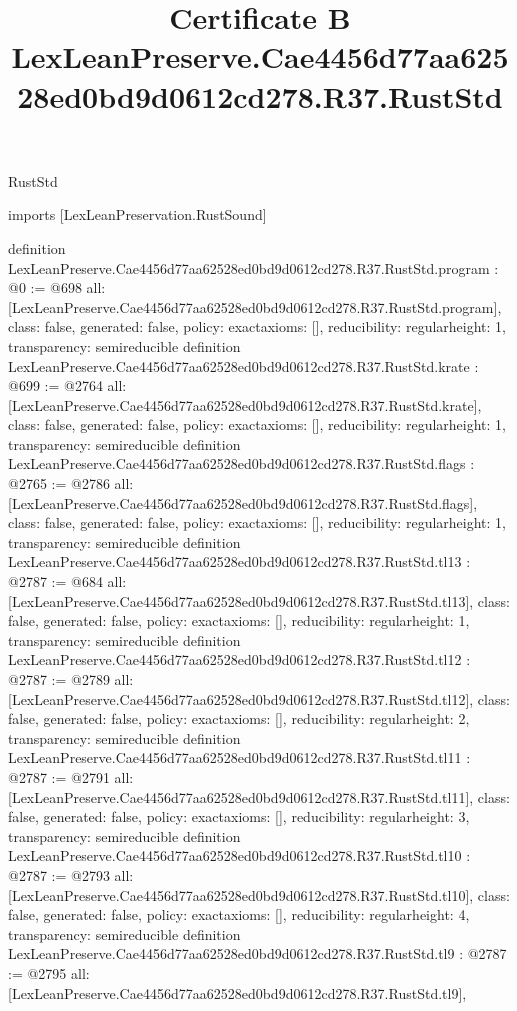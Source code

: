 \begin{lexlean}{RustStd}
\title{Certificate B LexLeanPreserve.Cae4456d77aa62528ed0bd9d0612cd278.R37.RustStd}
\begin{coremodule}
imports [LexLeanPreservation.RustSound]

definition LexLeanPreserve.Cae4456d77aa62528ed0bd9d0612cd278.R37.RustStd.program : @0 := @698 {
  all: [LexLeanPreserve.Cae4456d77aa62528ed0bd9d0612cd278.R37.RustStd.program],
  class: false,
  generated: false,
  policy: exact{axioms: []},
  reducibility: regular{height: 1},
  transparency: semireducible
}
definition LexLeanPreserve.Cae4456d77aa62528ed0bd9d0612cd278.R37.RustStd.krate : @699 := @2764 {
  all: [LexLeanPreserve.Cae4456d77aa62528ed0bd9d0612cd278.R37.RustStd.krate],
  class: false,
  generated: false,
  policy: exact{axioms: []},
  reducibility: regular{height: 1},
  transparency: semireducible
}
definition LexLeanPreserve.Cae4456d77aa62528ed0bd9d0612cd278.R37.RustStd.flags : @2765 := @2786 {
  all: [LexLeanPreserve.Cae4456d77aa62528ed0bd9d0612cd278.R37.RustStd.flags],
  class: false,
  generated: false,
  policy: exact{axioms: []},
  reducibility: regular{height: 1},
  transparency: semireducible
}
definition LexLeanPreserve.Cae4456d77aa62528ed0bd9d0612cd278.R37.RustStd.tl13 : @2787 := @684 {
  all: [LexLeanPreserve.Cae4456d77aa62528ed0bd9d0612cd278.R37.RustStd.tl13],
  class: false,
  generated: false,
  policy: exact{axioms: []},
  reducibility: regular{height: 1},
  transparency: semireducible
}
definition LexLeanPreserve.Cae4456d77aa62528ed0bd9d0612cd278.R37.RustStd.tl12 : @2787 := @2789 {
  all: [LexLeanPreserve.Cae4456d77aa62528ed0bd9d0612cd278.R37.RustStd.tl12],
  class: false,
  generated: false,
  policy: exact{axioms: []},
  reducibility: regular{height: 2},
  transparency: semireducible
}
definition LexLeanPreserve.Cae4456d77aa62528ed0bd9d0612cd278.R37.RustStd.tl11 : @2787 := @2791 {
  all: [LexLeanPreserve.Cae4456d77aa62528ed0bd9d0612cd278.R37.RustStd.tl11],
  class: false,
  generated: false,
  policy: exact{axioms: []},
  reducibility: regular{height: 3},
  transparency: semireducible
}
definition LexLeanPreserve.Cae4456d77aa62528ed0bd9d0612cd278.R37.RustStd.tl10 : @2787 := @2793 {
  all: [LexLeanPreserve.Cae4456d77aa62528ed0bd9d0612cd278.R37.RustStd.tl10],
  class: false,
  generated: false,
  policy: exact{axioms: []},
  reducibility: regular{height: 4},
  transparency: semireducible
}
definition LexLeanPreserve.Cae4456d77aa62528ed0bd9d0612cd278.R37.RustStd.tl9 : @2787 := @2795 {
  all: [LexLeanPreserve.Cae4456d77aa62528ed0bd9d0612cd278.R37.RustStd.tl9],
}
\end{coremodule}
\end{lexlean}
